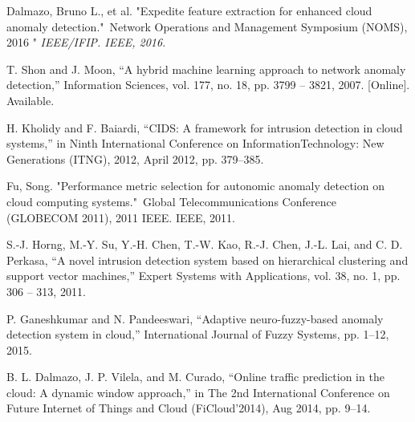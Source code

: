 \documentclass[a4paper, 12pt]{article}
\begin{document}
\begin{thebibliography}{21}
 Dalmazo, Bruno L., et al. "Expedite feature extraction for enhanced 	cloud anomaly detection." Network Operations and Management 	Symposium (NOMS), 2016 " \textit{IEEE/IFIP. IEEE, 2016}.

 T. Shon and J. Moon, “A hybrid machine learning approach to 	network anomaly detection,” Information Sciences, vol. 177, no. 18, 	pp. 3799 – 3821, 2007. [Online]. Available.

 H. Kholidy and F. Baiardi, “CIDS: A framework for intrusion 	detection in cloud systems,” in Ninth International Conference on 	InformationTechnology: New Generations (ITNG), 2012, April 2012, 	pp. 379–385.

 Fu, Song. "Performance metric selection for autonomic anomaly 	detection on cloud computing systems." Global Telecommunications 	Conference (GLOBECOM 2011), 2011 IEEE. IEEE, 2011.

 S.-J. Horng, M.-Y. Su, Y.-H. Chen, T.-W. Kao, R.-J. Chen, J.-L. Lai,	and C. D. Perkasa, “A novel intrusion detection system based on 	hierarchical clustering and support vector machines,” Expert Systems 	with Applications, vol. 38, no. 1, pp. 306 – 313, 2011.


 P. Ganeshkumar and N. Pandeeswari, “Adaptive neuro-fuzzy-based 	anomaly detection system in cloud,” International Journal of Fuzzy 	Systems, pp. 1–12, 2015.


B. L. Dalmazo, J. P. Vilela, and M. Curado, “Online traffic prediction 	in the cloud: A dynamic window approach,” in The 2nd International 	Conference on Future Internet of Things and Cloud (FiCloud’2014), 	Aug 2014, pp. 9–14.



\end{thebibliography}
\end{document}
